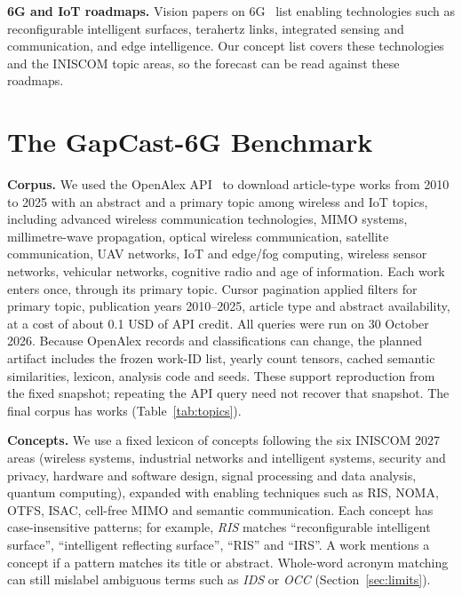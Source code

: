 \documentclass[runningheads]{llncs}
\newcommand{\bench}{GapCast-6G}
\begin{document}
\textbf{6G and IoT roadmaps.} Vision papers on 6G~\cite{saad2020vision,dang2020what,letaief2019roadmap} list enabling technologies such as reconfigurable intelligent surfaces, terahertz links, integrated sensing and communication, and edge intelligence. Our concept list covers these technologies and the INISCOM topic areas, so the forecast can be read against these roadmaps.

\section{The \bench{} Benchmark}

\textbf{Corpus.} We used the OpenAlex API~\cite{priem2022openalex} to download article-type works from 2010 to 2025 with an abstract and a primary topic among \nTopics{} wireless and IoT topics, including advanced wireless communication technologies, MIMO systems, millimetre-wave propagation, optical wireless communication, satellite communication, UAV networks, IoT and edge/fog computing, wireless sensor networks, vehicular networks, cognitive radio and age of information. Each work enters once, through its primary topic. Cursor pagination applied filters for primary topic, publication years 2010--2025, article type and abstract availability, at a cost of about 0.1 USD of API credit. All queries were run on 30 October 2026. Because OpenAlex records and classifications can change, the planned artifact includes the frozen work-ID list, yearly count tensors, cached semantic similarities, lexicon, analysis code and seeds. These support reproduction from the fixed snapshot; repeating the API query need not recover that snapshot. The final corpus has \nWorks{} works (Table~\ref{tab:topics}).

\begin{table}[t]
\centering
\caption{OpenAlex primary topics of the corpus and the number of works per topic (2010 to 2025, articles with an abstract).}
\label{tab:topics}
\scriptsize

\end{table}

\textbf{Concepts.} We use a fixed lexicon of \nConcepts{} concepts following the six INISCOM 2027 areas (wireless systems, industrial networks and intelligent systems, security and privacy, hardware and software design, signal processing and data analysis, quantum computing), expanded with enabling techniques such as RIS, NOMA, OTFS, ISAC, cell-free MIMO and semantic communication. Each concept has case-insensitive patterns; for example, \emph{RIS} matches ``reconfigurable intelligent surface'', ``intelligent reflecting surface'', ``RIS'' and ``IRS''. A work mentions a concept if a pattern matches its title or abstract. Whole-word acronym matching can still mislabel ambiguous terms such as \emph{IDS} or \emph{OCC} (Section~\ref{sec:limits}).
\end{document}
